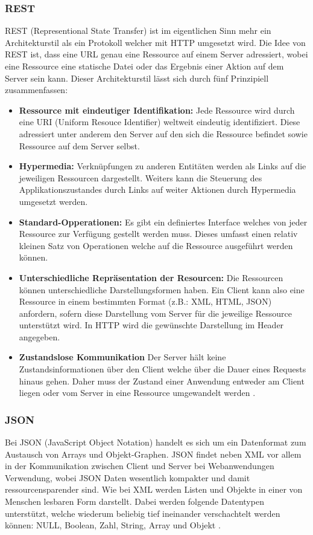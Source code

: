 \subsubsection{REST}
\label{sec:HTTP}
REST (Representional State Transfer) ist im eigentlichen Sinn mehr ein Architekturstil als ein Protokoll welcher mit HTTP umgesetzt wird.
Die Idee von REST ist, dass eine URL genau eine Ressource auf einem Server adressiert, 
wobei eine Ressource eine statische Datei oder das Ergebnis einer Aktion auf dem Server sein kann.
Dieser Architekturstil lässt sich durch fünf Prinzipiell zusammenfassen:
\begin{itemize}
	\item \textbf{Ressource mit eindeutiger Identifikation:}
		Jede Ressource wird durch eine URI (Uniform Resouce Identifier) weltweit eindeutig identifiziert.
		Diese adressiert unter anderem den Server auf den sich die Ressource befindet sowie Ressource auf dem Server selbst.
	\item \textbf{Hypermedia:}
		Verknüpfungen zu anderen Entitäten werden als Links auf die jeweiligen Ressourcen dargestellt.
		Weiters kann die Steuerung des Applikationszustandes durch Links auf weiter Aktionen durch Hypermedia umgesetzt werden.
	\item \textbf{Standard-Opperationen:}
		Es gibt ein definiertes Interface welches von jeder Ressource zur Verfügung gestellt werden muss.
		Dieses umfasst einen relativ kleinen Satz von Operationen welche auf die Ressource ausgeführt werden können.
	\item \textbf{Unterschiedliche Repräsentation der Resourcen:}
		Die Ressourcen können unterschiedliche Darstellungsformen haben.
		Ein Client kann also eine Ressource in einem bestimmten Format (z.B.: XML, HTML, JSON) anfordern,
		sofern diese Darstellung vom Server für die jeweilige Ressource unterstützt wird.
		In HTTP wird die gewünschte Darstellung im Header angegeben.
	\item \textbf{Zustandslose Kommunikation}
		Der Server hält keine Zustandsinformationen über den Client welche über die Dauer eines Requests hinaus gehen.
		Daher muss der Zustand einer Anwendung entweder am Client liegen oder vom Server in eine Ressource umgewandelt werden \cite{rest}. 
\end{itemize}


\subsubsection{JSON}
\label{sec:JSON}
Bei JSON (JavaScript Object Notation) handelt es sich um ein Datenformat zum Austausch von Arrays und Objekt-Graphen.
JSON findet neben XML vor allem in der Kommunikation zwischen Client und Server bei Webanwendungen Verwendung, 
wobei JSON Daten wesentlich kompakter und damit ressourcensparender sind.
Wie bei XML werden Listen und Objekte in einer von Menschen lesbaren Form darstellt.
Dabei werden folgende Datentypen unterstützt, welche wiederum beliebig tief ineinander verschachtelt werden können: NULL, Boolean, Zahl, String, Array und Objekt \cite{ajax}.

